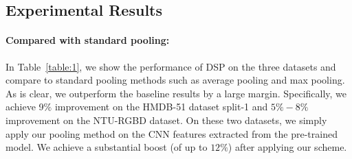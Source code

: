 \documentclass[runningheads]{llncs}
\begin{document}
\subsection{Experimental Results}
\paragraph*{\textbf{Compared with standard pooling:}} In Table~\ref{table:1}, we show the performance of DSP on the three datasets and compare to standard pooling methods such as average pooling and max pooling. As is clear, we outperform the baseline results by a large margin. Specifically, we achieve 9$\%$ improvement on the HMDB-51 dataset split-1 and $5\%-8\%$ improvement on the NTU-RGBD dataset. On these two datasets, we simply apply our pooling method on the CNN features extracted from the pre-trained model. We achieve a substantial boost (of up to $12\%$) after applying our scheme.
\end{document}
